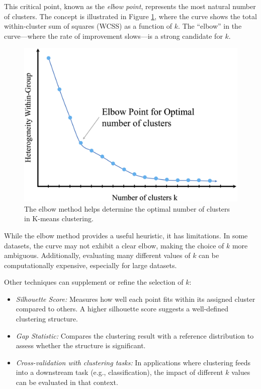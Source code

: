 \documentclass[
]{book}
\providecommand{\tightlist}{%
  \setlength{\itemsep}{0pt}\setlength{\parskip}{0pt}}
\theoremstyle{definition}
\theoremstyle{definition}
\theoremstyle{definition}
\theoremstyle{definition}
\theoremstyle{remark}
\begin{document}
This critical point, known as the \emph{elbow point}, represents the most natural number of clusters. The concept is illustrated in Figure \ref{fig:cluster-elbow}, where the curve shows the total within-cluster sum of squares (WCSS) as a function of \(k\). The ``elbow'' in the curve---where the rate of improvement slows---is a strong candidate for \(k\).

\begin{figure}

{\centering \includegraphics[width=0.6\linewidth]{images/ch13_cluster_elbow} 

}

\caption{The elbow method helps determine the optimal number of clusters in K-means clustering.}\label{fig:cluster-elbow}
\end{figure}

While the elbow method provides a useful heuristic, it has limitations. In some datasets, the curve may not exhibit a clear elbow, making the choice of \(k\) more ambiguous. Additionally, evaluating many different values of \(k\) can be computationally expensive, especially for large datasets.

Other techniques can supplement or refine the selection of \(k\):

\begin{itemize}
\tightlist
\item
  \emph{Silhouette Score:} Measures how well each point fits within its assigned cluster compared to others. A higher silhouette score suggests a well-defined clustering structure.\\
\item
  \emph{Gap Statistic:} Compares the clustering result with a reference distribution to assess whether the structure is significant.\\
\item
  \emph{Cross-validation with clustering tasks:} In applications where clustering feeds into a downstream task (e.g., classification), the impact of different \(k\) values can be evaluated in that context.
\end{itemize}
\end{document}
